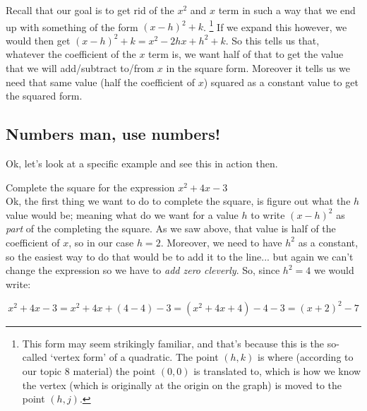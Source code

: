 \documentclass{ximeraXloud}
\begin{document}
    Recall that our goal is to get rid of the $x^2$ and $x$ term in such a way that we end up with something of the form $(x - h)^2 + k$.%
    \footnote{%
        This form may seem strikingly familiar, and that's because this is the so-called `vertex form' of a quadratic. The point $(h,k)$ is where (according to our topic 8 material) the point $(0,0)$ is translated to, which is how we know the vertex (which is originally at the origin on the graph) is moved to the point $(h,j)$.%
    }
    If we expand this however, we would then get $(x-h)^2+k = x^2 - 2hx + h^2 + k$. So this tells us that, whatever the coefficient of the $x$ term is, we want half of that to get the value that we will add/subtract to/from $x$ in the square form. Moreover it tells us we need that same value (half the coefficient of $x$) squared as a constant value to get the squared form.
    
    \subsection*{Numbers man, use numbers!}
        Ok, let's look at a specific example and see this in action then.
        
        \begin{example}
            Complete the square for the expression $x^2 + 4x - 3$\\
            
            Ok, the first thing we want to do to complete the square, is figure out what the $h$ value would be; meaning what do we want for a value $h$ to write $(x - h)^2$ as \textit{part} of the completing the square. As we saw above, that value is half of the coefficient of $x$, so in our case $h = 2$. Moreover, we need to have $h^2$ as a constant, so the easiest way to do that would be to add it to the line... but again we can't change the expression so we have to \textit{add zero cleverly}. So, since $h^2 = 4$ we would write:
            
            \[
                x^2 + 4x - 3 = x^2 + 4x + (4 - 4) - 3 = (x^2 + 4x + 4) - 4 - 3 = (x + 2)^2 - 7
            \]
        \end{example}
\end{document}
